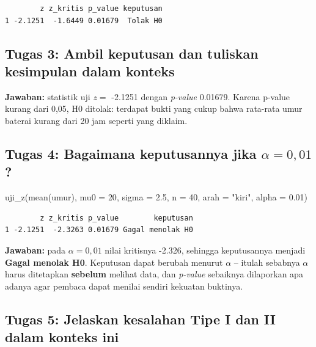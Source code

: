 \documentclass[
  indonesian,
  letterpaper,
]{book}
\newenvironment{Shaded}{\begin{snugshade}}{\end{snugshade}}
\newcommand{\AttributeTok}[1]{\textcolor[rgb]{0.40,0.45,0.13}{#1}}
\newcommand{\DecValTok}[1]{\textcolor[rgb]{0.68,0.00,0.00}{#1}}
\newcommand{\FloatTok}[1]{\textcolor[rgb]{0.68,0.00,0.00}{#1}}
\newcommand{\FunctionTok}[1]{\textcolor[rgb]{0.28,0.35,0.67}{#1}}
\newcommand{\NormalTok}[1]{\textcolor[rgb]{0.00,0.23,0.31}{#1}}
\newcommand{\StringTok}[1]{\textcolor[rgb]{0.13,0.47,0.30}{#1}}
\begin{document}
\begin{verbatim}
        z z_kritis p_value keputusan
1 -2.1251  -1.6449 0.01679  Tolak H0
\end{verbatim}

\subsection{Tugas 3: Ambil keputusan dan tuliskan kesimpulan dalam
konteks}\label{tugas-3-ambil-keputusan-dan-tuliskan-kesimpulan-dalam-konteks}

\textbf{Jawaban:} statistik uji \(z =\) -2.1251 dengan \emph{p-value}
0.01679. Karena p-value kurang dari 0,05, H0 ditolak: terdapat bukti
yang cukup bahwa rata-rata umur baterai kurang dari 20 jam seperti yang
diklaim.

\subsection{\texorpdfstring{Tugas 4: Bagaimana keputusannya jika
\(\alpha = 0{,}01\)?}{Tugas 4: Bagaimana keputusannya jika \textbackslash alpha = 0\{,\}01?}}\label{tugas-4-bagaimana-keputusannya-jika-alpha-001}

\begin{Shaded}
\begin{Highlighting}[]
\FunctionTok{uji\_z}\NormalTok{(}\FunctionTok{mean}\NormalTok{(umur), }\AttributeTok{mu0 =} \DecValTok{20}\NormalTok{, }\AttributeTok{sigma =} \FloatTok{2.5}\NormalTok{, }\AttributeTok{n =} \DecValTok{40}\NormalTok{, }\AttributeTok{arah =} \StringTok{"kiri"}\NormalTok{, }\AttributeTok{alpha =} \FloatTok{0.01}\NormalTok{)}
\end{Highlighting}
\end{Shaded}

\begin{verbatim}
        z z_kritis p_value        keputusan
1 -2.1251  -2.3263 0.01679 Gagal menolak H0
\end{verbatim}

\textbf{Jawaban:} pada \(\alpha = 0{,}01\) nilai kritisnya -2.326,
sehingga keputusannya menjadi \textbf{Gagal menolak H0}. Keputusan dapat
berubah menurut \(\alpha\) -- itulah sebabnya \(\alpha\) harus
ditetapkan \textbf{sebelum} melihat data, dan \emph{p-value} sebaiknya
dilaporkan apa adanya agar pembaca dapat menilai sendiri kekuatan
buktinya.

\subsection{Tugas 5: Jelaskan kesalahan Tipe I dan II dalam konteks
ini}\label{tugas-5-jelaskan-kesalahan-tipe-i-dan-ii-dalam-konteks-ini}
\end{document}
